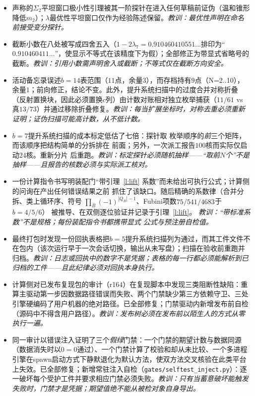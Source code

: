 \documentclass[11pt]{article}
\numberwithin{equation}{section}
\theoremstyle{definition}
\theoremstyle{remark}
\begin{document}
\begin{itemize}
\item[D23.] 声称的$\Sigma_2$平坦窗口极小性引理被其一阶探针在进入任何草稿前证伪（温和锥形降低$m_2$）；$\lambda$最优性平坦窗口仅作为经验陈述保留。\emph{教训：最优性声明在命名前接受变分探针。}
\item[D24.] 截断小数在八处被写成四舍五入（$1-2\lambda_7=0.910460410551\ldots$排印为“$0.910460411\ldots$”，使显示不等式在该精度下为假）；全部修正为带显式省略号的截断。\emph{教训：引用小数需声明舍入或截断；不等式仅在截断方向安全。}
\item[D25.] 活动备忘录误述$b=14$表范围（$11$点，余量$3$），而存档持有$9$点（N=2..10），余量$1$；前向修正，结论不变。此外，提升系统扫描中的过度合并对称折叠（反射置换块，因此必须置换$c$列）由计数对账相对独立枚举捕获（$11/61$ vs 真$13/73$）并通过移除折叠修复。\emph{教训：每当扩展坐标时，对称去重必须重新证明；证伪扫描可能高计数，从不低计数。}
\item[D26.] $b=7$提升系统扫描的成本标定低估了七倍：探针取
枚举顺序的\emph{前}三个矩阵，而该顺序把结构简单的分拆排在
前面；另外，一次派工报告$100$核而实际仅启动$24$核。重新分片
后重跑。\emph{教训：标定探针必须随机抽样——``取前$N$个''不是
抽样——且报告的核数必须与实际派工核对。}
\item[D27.] 一份计算指令书写明装配门``带引理~\ref{l:lift}
系数''而未给出可执行公式；计算侧的问询在产出任何错误结果之前
抓住了该缺口。随后精确的系数律（合并分拆、类上循环序、符号
$\prod_B(-1)^{|Q_B|-1}$、Fubini项数$75/541/4683$于$b=4/5/6$）
被推导、在双侧逐位验证并记录于引理~\ref{l:lift}。
\emph{教训：``带标准系数''不是规格；每份装配指令书都携带显式
公式与预注册自检值。}
\item[D28.] 最终打包时发现一份回执表格把$b=5$提升系统扫描列为通过，而其工件文件不在包内（该次运行早于一次会话切换，输出从未写盘）；扫描在验收前重跑并归档。\emph{教训：日志或回执中的数字不是凭据；表格的每一行都必须能解析到已归档的工件——且此纪律必须对回执本身执行。}
\item[D29.] 计算侧对已发布复现包的审计（r164）在复现脚本中发现三类阻断性缺陷：重算主驱动第一步因数据路径错误而失败、两个门禁缺少第三方依赖守卫、三处引擎硬编码了用户机器的绝对路径。已全部修复；门禁驱动内新增发布前自检（源码中不得含用户路径）。\emph{教训：发布树必须在发布前以陌生人的方式从零执行一遍。}
\item[D30.] 同一审计以错误注入证明了三个\emph{假绿}门禁：一个门禁的期望计数与数据同源（数据消失时以$0=0$通过）、一个门禁计算了校验和却从未比较、一个多进程引擎在spawn启动方式下静默退化为默认方法，使双方法交叉核验在此类平台上失效。已全部修复；新增常驻注入自检（\texttt{gates/selftest\_inject.py}）：逐一破坏每个受护工件并要求相应门禁必须失败。\emph{教训：只有当蓄意破坏能触发失败时，门禁才是凭据；期望值绝不能从被检对象自身导出。}

\end{itemize}
\end{document}
